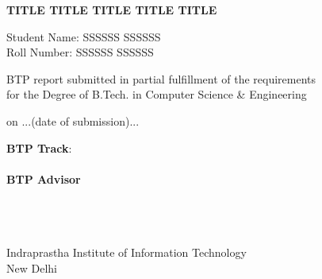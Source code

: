 \begin{center}

\vspace{5.65in}

{\LARGE \bf {TITLE TITLE TITLE TITLE TITLE }

 }  
 \vspace{.3in}
 
 {\Large{Student Name: SSSSSS SSSSSS}} \\  
 {\large{Roll Number: SSSSSS SSSSSS}} \\  
 \vspace{.1in} 


  
    \vspace{.65in}



\vspace{.65in}


 {BTP report submitted in partial fulfillment of the requirements 
\\for the Degree of B.Tech. in Computer Science \& Engineering}


on {...(date of submission)...} \\

\vspace{.65in}

\textbf{BTP Track}: \btptrack\\
\quad\\

  {\textbf{BTP Advisor} \\ 
\supervisorone              \\ 
\supervisortwo \\ 
\supervisorthree \\ }
\vspace{3.0in}


{Indraprastha Institute of Information Technology\\
New Delhi}



\end{center}


